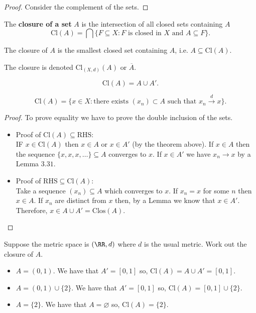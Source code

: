 \documentclass[12pt, a4paper]{article}
\begin{document}
\begin{proof}
    Consider the complement of the sets.
\end{proof}

\begin{definition}
    The \textbf{closure of a set} \(A\) is the intersection of all closed sets containing \(A\)
    \[\text{Cl}(A) = \bigcap \{F \subseteq X : F \text{ is closed in } X \text{ and } A \subseteq F\}.\]
\end{definition}

\begin{mdremark}
    The closure of \(A\) is the smallest closed set containing \(A\), i.e. \(A \subseteq \text{Cl}(A)\).
\end{mdremark}

\begin{mdremark}
    The closure is denoted \(\text{Cl}_{(X,d)}(A)\) or \(\overline{A}\).
\end{mdremark}

\begin{mdthm}
    \[\text{Cl}(A) = A \cup A'.\]
\end{mdthm}

\begin{corollary}
    \[\text{Cl}(A) = \{x \in X : \text{there exists } (x_n) \subset A \text{ such that } x_n \xrightarrow{d} x\}.\]
\end{corollary}

\begin{proof}
    To prove equality we have to prove the double inclusion of the sets.
    \begin{itemize}
        \item Proof of \(\text{Cl}(A) \subseteq \text{RHS}\): \\
        IF \(x \in \text{Cl}(A)\) then \(x \in A\) or \(x \in A'\) (by the theorem above). If \(x \in A\) then the sequence \(\{x,x,x, \ldots \} \subseteq A\) converges to \(x\). If \(x \in A'\) we have \(x_n \to x\) by a Lemma \(3.31\).
        \item Proof of \(\text{RHS} \subseteq \text{Cl}(A)\):\\
        Take a sequence \((x_n) \subseteq A\) which converges to \(x\). If \(x_n =x\) for some \(n\) then \(x \in A\). If \(x_n\) are distinct from \(x\) then, by a Lemma we know that \(x \in A'\). Therefore, \(x \in A \cup A' = \text{Clos}(A)\).
    \end{itemize}
\end{proof}

\begin{mdexample}
    Suppose the metric space is \((\RR,d)\) where \(d\) is the usual metric. Work out the closure of \(A\).
    \begin{itemize}
        \item \(A = (0,1)\). We have that \(A'=[0,1]\) so, \(\text{Cl}(A) = A \cup A' = [0,1]\).
        \item \(A = (0,1) \cup \{2\}\). We have that \(A'=[0,1]\) so, \(\text{Cl}(A) = [0,1] \cup \{2\}\).
        \item \(A =\{2\}\). We have that \(A = \varnothing\) so, \(\text{Cl}(A) = \{2\}\).
    \end{itemize}
\end{mdexample}
\end{document}
